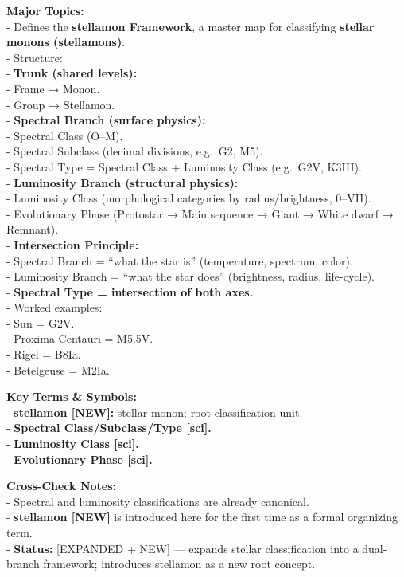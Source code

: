 \documentclass[
  letterpaper,
]{book}
\begin{document}
\textbf{Major Topics:}\\
- Defines the \textbf{stellamon Framework}, a master map for classifying
\textbf{stellar monons (stellamons)}.\\
- Structure:\\
- \textbf{Trunk (shared levels):}\\
- Frame → Monon.\\
- Group → Stellamon.\\
- \textbf{Spectral Branch (surface physics):}\\
- Spectral Class (O--M).\\
- Spectral Subclass (decimal divisions, e.g.~G2, M5).\\
- Spectral Type = Spectral Class + Luminosity Class (e.g.~G2V, K3III).\\
- \textbf{Luminosity Branch (structural physics):}\\
- Luminosity Class (morphological categories by radius/brightness,
0--VII).\\
- Evolutionary Phase (Protostar → Main sequence → Giant → White dwarf →
Remnant).\\
- \textbf{Intersection Principle:}\\
- Spectral Branch = ``what the star is'' (temperature, spectrum,
color).\\
- Luminosity Branch = ``what the star does'' (brightness, radius,
life-cycle).\\
- \textbf{Spectral Type = intersection of both axes.}\\
- Worked examples:\\
- Sun = G2V.\\
- Proxima Centauri = M5.5V.\\
- Rigel = B8Ia.\\
- Betelgeuse = M2Ia.

\textbf{Key Terms \& Symbols:}\\
- \textbf{stellamon {[}NEW{]}:} stellar monon; root classification
unit.\\
- \textbf{Spectral Class/Subclass/Type {[}sci{]}.}\\
- \textbf{Luminosity Class {[}sci{]}.}\\
- \textbf{Evolutionary Phase {[}sci{]}.}

\textbf{Cross-Check Notes:}\\
- Spectral and luminosity classifications are already canonical.\\
- \textbf{stellamon {[}NEW{]}} is introduced here for the first time as
a formal organizing term.\\
- \textbf{Status:} {[}EXPANDED + NEW{]} --- expands stellar
classification into a dual-branch framework; introduces stellamon as a
new root concept.
\end{document}
